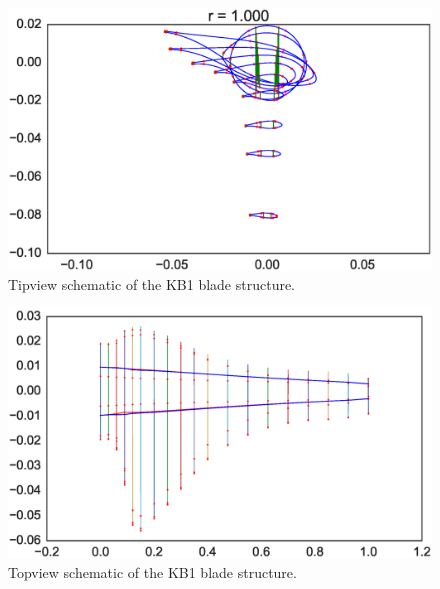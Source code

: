 \begin{figure}[pht]
\begin{center}
	\includegraphics[width=.85\linewidth]{figures/KB1_tipview.eps}
\end{center}
\caption{Tipview schematic of the KB1 blade structure.}
\label{fig:tipview}
\end{figure}

\begin{figure}[pht]
\begin{center}
	\includegraphics[width=.85\linewidth]{figures/KB1_topview.eps}
\end{center}
\caption{Topview schematic of the KB1 blade structure.}
\label{fig:topview}
\end{figure}

